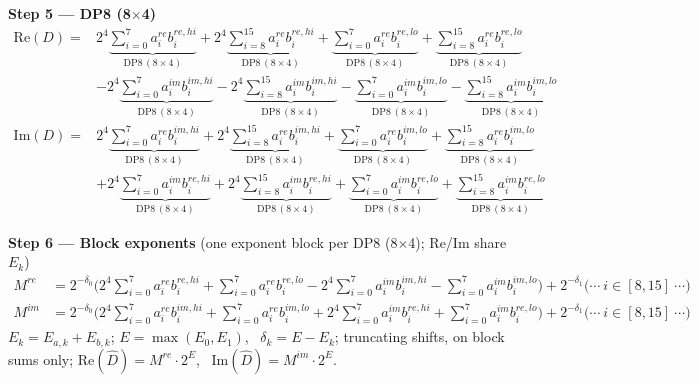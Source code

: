 \documentclass[fleqn]{article}
\newcommand{\DPop}[3]{\mathrm{DP#1}\,(#2\!\times\!#3)}
\begin{document}
\textbf{Step 5 --- DP8 (8$\times$4)}
\begin{align*}
\mathrm{Re}(D) = {}
  & 2^{4} \underbrace{\sum_{i=0}^{7} a_i^{re} b_i^{re,hi}}_{\DPop{8}{8}{4}}
  + 2^{4} \underbrace{\sum_{i=8}^{15} a_i^{re} b_i^{re,hi}}_{\DPop{8}{8}{4}}
  + \underbrace{\sum_{i=0}^{7} a_i^{re} b_i^{re,lo}}_{\DPop{8}{8}{4}}
  + \underbrace{\sum_{i=8}^{15} a_i^{re} b_i^{re,lo}}_{\DPop{8}{8}{4}} \\[1em]
  & - 2^{4} \underbrace{\sum_{i=0}^{7} a_i^{im} b_i^{im,hi}}_{\DPop{8}{8}{4}}
  - 2^{4} \underbrace{\sum_{i=8}^{15} a_i^{im} b_i^{im,hi}}_{\DPop{8}{8}{4}}
  - \underbrace{\sum_{i=0}^{7} a_i^{im} b_i^{im,lo}}_{\DPop{8}{8}{4}}
  - \underbrace{\sum_{i=8}^{15} a_i^{im} b_i^{im,lo}}_{\DPop{8}{8}{4}}
\end{align*}
\begin{align*}
\mathrm{Im}(D) = {}
  & 2^{4} \underbrace{\sum_{i=0}^{7} a_i^{re} b_i^{im,hi}}_{\DPop{8}{8}{4}}
  + 2^{4} \underbrace{\sum_{i=8}^{15} a_i^{re} b_i^{im,hi}}_{\DPop{8}{8}{4}}
  + \underbrace{\sum_{i=0}^{7} a_i^{re} b_i^{im,lo}}_{\DPop{8}{8}{4}}
  + \underbrace{\sum_{i=8}^{15} a_i^{re} b_i^{im,lo}}_{\DPop{8}{8}{4}} \\[1em]
  & + 2^{4} \underbrace{\sum_{i=0}^{7} a_i^{im} b_i^{re,hi}}_{\DPop{8}{8}{4}}
  + 2^{4} \underbrace{\sum_{i=8}^{15} a_i^{im} b_i^{re,hi}}_{\DPop{8}{8}{4}}
  + \underbrace{\sum_{i=0}^{7} a_i^{im} b_i^{re,lo}}_{\DPop{8}{8}{4}}
  + \underbrace{\sum_{i=8}^{15} a_i^{im} b_i^{re,lo}}_{\DPop{8}{8}{4}}
\end{align*}

\textbf{Step 6 --- Block exponents}\quad
{\small(one exponent block per DP8 (8$\times$4); $\mathrm{Re}$/$\mathrm{Im}$ share $E_k$)}
\begin{align*}
M^{re} &= 2^{-\delta_0}\Big(2^{4}\!\sum_{i=0}^{7} a_i^{re} b_i^{re,hi} + \sum_{i=0}^{7} a_i^{re} b_i^{re,lo} - 2^{4}\!\sum_{i=0}^{7} a_i^{im} b_i^{im,hi} - \sum_{i=0}^{7} a_i^{im} b_i^{im,lo}\Big) + 2^{-\delta_1}\Big(\cdots\ i\!\in\![8,15]\ \cdots\Big) \\[0.15em]
M^{im} &= 2^{-\delta_0}\Big(2^{4}\!\sum_{i=0}^{7} a_i^{re} b_i^{im,hi} + \sum_{i=0}^{7} a_i^{re} b_i^{im,lo} + 2^{4}\!\sum_{i=0}^{7} a_i^{im} b_i^{re,hi} + \sum_{i=0}^{7} a_i^{im} b_i^{re,lo}\Big) + 2^{-\delta_1}\Big(\cdots\ i\!\in\![8,15]\ \cdots\Big)
\end{align*}
$E_k=E_{a,k}+E_{b,k}$; \quad $E=\max(E_0,E_1)$, \ $\delta_k=E-E_k$; \quad truncating shifts, on block sums only; \quad $\mathrm{Re}(\hat D)=M^{re}\cdot2^{E}$, \ $\mathrm{Im}(\hat D)=M^{im}\cdot2^{E}$.
\end{document}
